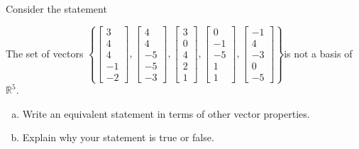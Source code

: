 
\begin{exerciseStatement}


Consider the statement 
\begin{center}\begin{minipage}{0.8\textwidth}
 The set of vectors \( \left\{ \left[\begin{array}{c}
3 \\
4 \\
4 \\
-1 \\
-2
\end{array}\right] , \left[\begin{array}{c}
4 \\
4 \\
-5 \\
-5 \\
-3
\end{array}\right] , \left[\begin{array}{c}
3 \\
0 \\
4 \\
2 \\
1
\end{array}\right] , \left[\begin{array}{c}
0 \\
-1 \\
-5 \\
1 \\
1
\end{array}\right] , \left[\begin{array}{c}
-1 \\
4 \\
-3 \\
0 \\
-5
\end{array}\right] \right\} \)is not a basis of \(\mathbb{R}^5\). 
\end{minipage}\end{center}
    


\begin{enumerate}[(a)]
\item  Write an equivalent statement in terms of other vector properties.
\item  Explain why your statement is true or false.
\end{enumerate}
    
\end{exerciseStatement}
    
